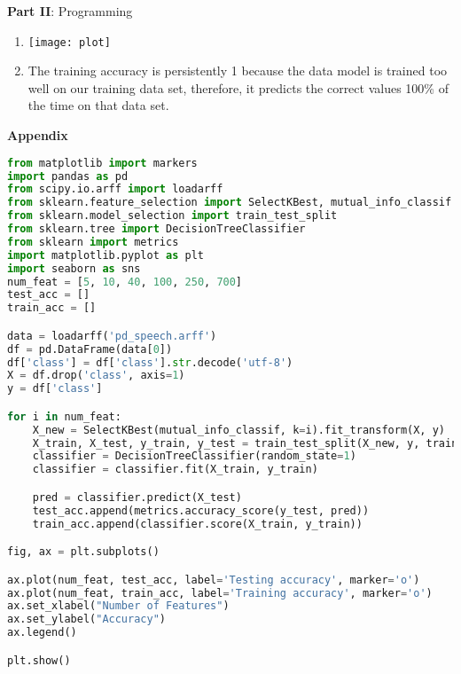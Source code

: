 \documentclass[12pt]{article}
\begin{document}
\center\large{\textbf{Part II}: Programming}

\begin{enumerate}[leftmargin=\labelsep,resume]
\item  \leavevmode\vadjust{\vspace{-\baselineskip}}\newline
\texttt{[image: plot]}
\item
The training accuracy is persistently 1 because the data model is trained too well on 
our training data set, therefore, it predicts the correct values 100\% of the time on that 
data set.

\end{enumerate}
\newpage
\center\large{\textbf{Appendix}\vskip 0.3cm}

\begin{lstlisting}[language=Python]
from matplotlib import markers
import pandas as pd
from scipy.io.arff import loadarff
from sklearn.feature_selection import SelectKBest, mutual_info_classif
from sklearn.model_selection import train_test_split
from sklearn.tree import DecisionTreeClassifier
from sklearn import metrics
import matplotlib.pyplot as plt
import seaborn as sns
num_feat = [5, 10, 40, 100, 250, 700]
test_acc = []
train_acc = []

data = loadarff('pd_speech.arff')
df = pd.DataFrame(data[0])
df['class'] = df['class'].str.decode('utf-8')
X = df.drop('class', axis=1)
y = df['class']

for i in num_feat:
    X_new = SelectKBest(mutual_info_classif, k=i).fit_transform(X, y)
    X_train, X_test, y_train, y_test = train_test_split(X_new, y, train_size = 0.7, stratify = y,random_state = 1)
    classifier = DecisionTreeClassifier(random_state=1)
    classifier = classifier.fit(X_train, y_train)

    pred = classifier.predict(X_test)
    test_acc.append(metrics.accuracy_score(y_test, pred))
    train_acc.append(classifier.score(X_train, y_train))

fig, ax = plt.subplots()

ax.plot(num_feat, test_acc, label='Testing accuracy', marker='o')
ax.plot(num_feat, train_acc, label='Training accuracy', marker='o')
ax.set_xlabel("Number of Features")
ax.set_ylabel("Accuracy")
ax.legend()

plt.show()
\end{lstlisting}
\end{document}
